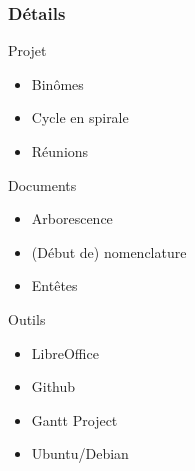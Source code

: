 \begin{frame}
\frametitle{Détails}

\begin{block}{Projet}
\begin{itemize}
	\item Binômes %
	\item Cycle en spirale %
	\item Réunions %
\end{itemize}
\end{block} %

\pause 

\begin{block}{Documents}
\begin{itemize}
	\item Arborescence %
	\item (Début de) nomenclature %
	\item Entêtes %
\end{itemize}
\end{block} %

\pause 

\begin{block}{Outils} %
\begin{itemize}
    \item LibreOffice %
    \item Github %
    \item Gantt Project %
	\item Ubuntu/Debian %
\end{itemize}
\end{block} %

\end{frame} %

